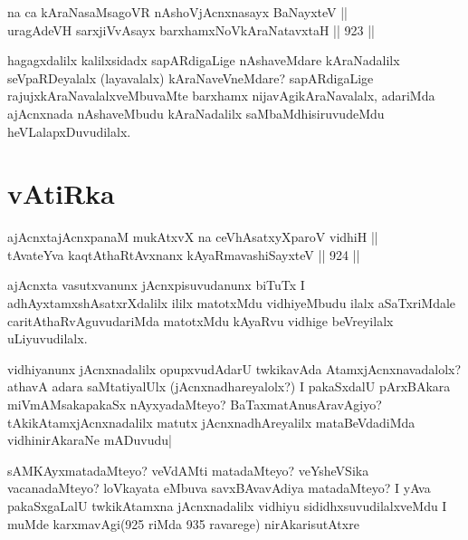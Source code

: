 \begin{shl}
na ca kAraNasaMsagoVR nAshoV\s jAcnxnasayx BaNayxteV || \\
uragAdeVH sarxjiVvAsayx barxhamxNoV\s kAraNatavxtaH ||  923 ||  
\end{shl}

\begin{artha}
hagagxdalilx kalilxsidadx sapARdigaLige nAshaveMdare kAraNadalilx seVpaRDeyalalx (layavalalx) kAraNaveVneMdare? sapARdigaLige rajujxkAraNavalalxveMbuvaMte barxhamx nijavAgikAraNavalalx, adariMda ajAcnxnada nAshaveMbudu kAraNadalilx saMbaMdhisiruvudeMdu heVLalapxDuvudilalx.
\end{artha}

\section*{vAtiRka}


\begin{shl}
ajAcnxtajAcnxpanaM mukAtxvX na ceVhAsatxyXparoV vidhiH || \\
tAvateYva kaqtAthaRtAvxnanx kAyaRmavashiSayxteV ||  924 ||  
\end{shl}

\begin{artha}
ajAcnxta vasutxvanunx jAcnxpisuvudanunx biTuTx I adhAyxtamxshAsatxrXdalilx ililx matotxMdu vidhiyeMbudu ilalx aSaTxriMdale caritAthaRvAguvudariMda matotxMdu kAyaRvu vidhige beVreyilalx uLiyuvudilalx.
\end{artha}

\begin{artha}
vidhiyanunx jAcnxnadalilx opupxvudAdarU twkikavAda AtamxjAcnxnavadalolx? athavA adara saMtatiyalUlx (jAcnxnadhareyalolx?) I pakaSxdalU pArxBAkara miVmAMsakapakaSx nAyxyadaMteyo? BaTaxmatAnusAravAgiyo?tAkikAtamxjAcnxnadalilx matutx jAcnxnadhAreyalilx mataBeVdadiMda vidhinirAkaraNe mADuvudu|
\end{artha}

\begin{artha}
sAMKAyxmatadaMteyo? veVdAMti matadaMteyo? veYsheVSika vacanadaMteyo? loVkayata eMbuva savxBAvavAdiya matadaMteyo? I yAva pakaSxgaLalU twkikAtamxna jAcnxnadalilx vidhiyu sididhxsuvudilalxveMdu I muMde karxmavAgi(925 riMda 935 ravarege) nirAkarisutAtxre
\end{artha}


